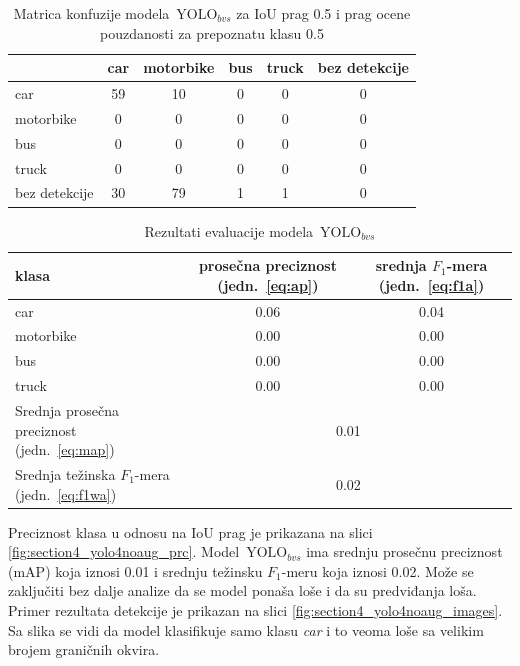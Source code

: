 \documentclass[12pt,oneside]{memoir}
\newcommand{\yolo}{\ensuremath{\,\textrm{YOLO}}}
\begin{document}
\begin{table}
    \begin{center}
    \caption{Matrica konfuzije modela $\yolo_{bvs}$ za IoU prag 0.5 i prag ocene pouzdanosti za prepoznatu klasu 0.5 }
    \begin{tabular}{ l|c|c|c|c|c|}
                  & car  & motorbike & bus & truck & bez detekcije \\ \hline
    car           & 59   & 10        & 0   & 0     & 0             \\ 
    motorbike     & 0    & 0         & 0   & 0     & 0             \\ 
    bus           & 0    & 0         & 0   & 0     & 0             \\ 
    truck         & 0    & 0         & 0   & 0     & 0             \\ 
    bez detekcije & 30   & 79        & 1   & 1     & 0             \\ \hline
    \end{tabular}
    \label{tab:section4_yolo4noaug_confusionmatrix}
    \end{center}
\end{table}


\begin{table}
    \begin{center}
    \caption{Rezultati evaluacije modela $\yolo_{bvs}$}
        \begin{tabular}{|m{10em}|c|c|}
        \toprule
        klasa     & prosečna preciznost (jedn.~\ref{eq:ap}) & srednja $F_1$-mera (jedn.~\ref{eq:f1a})  \\ \hline
        \midrule
        car       & 0.06  & 0.04 \\ \hline
        motorbike & 0.00  & 0.00 \\ \hline
        bus       & 0.00  & 0.00 \\ \hline
        truck     & 0.00  & 0.00 \\ \hline
        \bottomrule
        Srednja prosečna preciznost (jedn.~\ref{eq:map}) & \multicolumn{2}{c|}{0.01}  \\ \hline
        Srednja težinska $F_1$-mera (jedn.~\ref{eq:f1wa}) & \multicolumn{2}{c|}{0.02}  \\ \hline
    \end{tabular}
    \label{tab:section4_yolo4noaug_results}
    \end{center}
\end{table}

Preciznost klasa u odnosu na IoU prag je prikazana na slici \ref{fig:section4_yolo4noaug_prc}. Model $\yolo_{bvs}$ ima srednju prosečnu preciznost (mAP) koja iznosi 0.01 i srednju težinsku $F_1$-meru koja iznosi 0.02. Može se zaključiti bez dalje analize da se model ponaša loše i da su predviđanja loša. Primer rezultata detekcije je prikazan na slici \ref{fig:section4_yolo4noaug_images}. Sa slika se vidi da model klasifikuje samo klasu \textit{car} i to veoma loše sa velikim brojem graničnih okvira.
\end{document}
